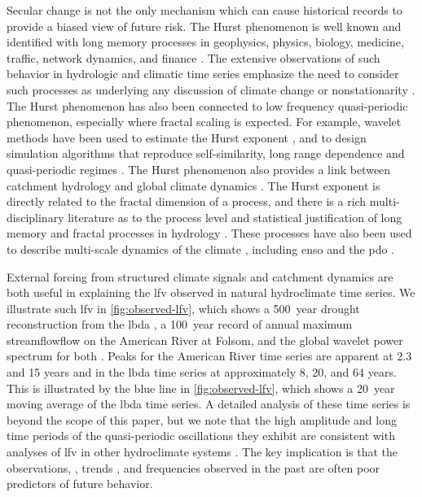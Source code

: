 \documentclass[
  draft,
  linenumbers
]{agujournal2019}
\begin{document}
Secular change is not the only mechanism which can cause historical records to provide a biased view of future risk.
The Hurst phenomenon is well known and identified with long memory processes in geophysics, physics, biology, medicine, traffic, network dynamics, and finance \citep{oconnell:2016}.
The extensive observations of such behavior in hydrologic and climatic time series emphasize the need to consider such processes as underlying any discussion of climate change or nonstationarity \citep{koutsoyiannis:2003,markonis:2013,Palmer:1993ef}.
The Hurst phenomenon has also been connected to low frequency quasi-periodic phenomenon, especially where fractal scaling is expected.
For example, wavelet methods have been used to estimate the Hurst exponent \citep{simonsen:1998,chamoli:2007}, and to design simulation algorithms that reproduce self-similarity, long range dependence and quasi-periodic regimes \citep{Kwon:2007fj,bullmore:2001,geweke:1983,feng:2005}.
The Hurst phenomenon also provides a link between catchment hydrology and global climate dynamics \citep{bloschl:2010,montanari:2003}.
The Hurst exponent is directly related to the fractal dimension of a process, and there is a rich multi-disciplinary literature as to the process level and statistical justification of long memory and fractal processes in hydrology \citep{mandelbrot:1985,mandelbrot:1969,beran:1994}.
These processes have also been used to describe multi-scale dynamics of the climate \citep{lovejoy:2012,lovejoy:2013a,lovejoy:2013,selvam:2017}, including \gls{enso} \citep{maruyama:2018,zivkovic:2013} and the \gls{pdo} \citep{Mantua:1997kj}.

External forcing from structured climate signals \citep[``teleconnections'';][]{Angstrom:1935ej} and catchment dynamics are both useful in explaining the \gls{lfv} observed in natural hydroclimate time series.
We illustrate such \gls{lfv} in \cref{fig:observed-lfv}, which shows a \SI{500}{year} drought reconstruction from the \gls{lbda} \citep{Cook:2010bz}, a \SI{100}{year} record of annual maximum streamflowflow on the American River at Folsom, and the global wavelet power spectrum for both \citep{Torrence:1998jp,Roesch:wlBQQoIs}.
Peaks for the American River time series are apparent at 2.3 and 15 years and in the \gls{lbda} time series at approximately 8, 20, and 64 years.
This is illustrated by the blue line in  \cref{fig:observed-lfv}, which shows a \SI{20}{year} moving average of the \gls{lbda} time series.
A detailed analysis of these time series is beyond the scope of this paper, but we note that the high amplitude and long time periods of the quasi-periodic oscillations they exhibit are consistent with analyses of \gls{lfv} in other hydroclimate systems \citep{Kiem:2002kq,Swierczynski:2012km,Woollings:2014kd,Hodgkins:2017hw}.
The key implication is that the observations, \citep{Jain:2001hz}, trends \citep{bhattacharya:1983}, and frequencies \citep{newman:2016} observed in the past are often poor predictors of future behavior.
\end{document}
